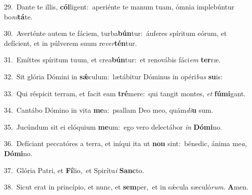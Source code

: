 {\numbfont\textcolor{\numbcolor}{29.}}~Dante te illis, \textbf{cól}\-ligent:~\star aperiénte te manum tuam, ómnia implebúntur bo\-\textit{ni}\-\textbf{tá}te.\par
{\numbfont\textcolor{\numbcolor}{30.}}~Averténte autem te fáciem, turba\-\textbf{bún}\-tur:~\star áuferes spíritum eórum, et defícient, et in púlverem suum re\-\textit{ver}\-\textbf{tén}tur.\par
{\numbfont\textcolor{\numbcolor}{31.}}~Emíttes spíritum tuum, et crea\-\textbf{bún}\-tur:~\star et renovábis fáci\textit{em} \textbf{ter}\-ræ.\par
{\numbfont\textcolor{\numbcolor}{32.}}~Sit glória Dómini in \textbf{sǽ}\-culum:~\star lætábitur Dóminus in opéri\textit{bus} \textbf{su}\-is:\par
{\numbfont\textcolor{\numbcolor}{33.}}~Qui réspicit terram, et facit eam \textbf{tré}\-mere:~\star qui tangit montes, \textit{et} \textbf{fú}\-\textbf{mi}gant.\par
{\numbfont\textcolor{\numbcolor}{34.}}~Cantábo Dómino in vita \textbf{me}\-a:~\star psallam Deo meo, quám\-\textit{di}\-\textbf{u} sum.\par
{\numbfont\textcolor{\numbcolor}{35.}}~Jucúndum sit ei elóquium \textbf{me}\-um:~\star ego vero delectábor \textit{in} \textbf{Dó}\-\textbf{mi}no.\par
{\numbfont\textcolor{\numbcolor}{36.}}~Defíciant peccatóres a terra, et iníqui ita ut \textbf{non} sint:~\star bénedic, ánima me\-\textit{a}\-, \textbf{Dó}\-\textbf{mi}no.\par
{\numbfont\textcolor{\numbcolor}{37.}}~Glória Patri, et \textbf{Fí}\-lio,~\star et Spirítu\textit{i} \textbf{Sanc}\-to.\par
{\numbfont\textcolor{\numbcolor}{38.}}~Sicut erat in princípio, et nunc, et \textbf{sem}\-per,~\star et in sǽcula sæculó\-\textit{rum}\-. \textbf{A}\-men.\par

